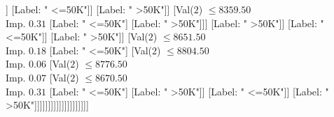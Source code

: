 \documentclass[margin=10pt]{standalone}
\begin{document}
\begin{forest}
																																													[Val($2$) $ \leq 8549.50$ \\ Imp. $0.02$
																																														[Val($2$) $ \leq 8508.50$ \\ Imp. $0.06$
																																															[Val($2$) $ \leq 8430.50$ \\ Imp. $0.17$
																																																[Val($2$) $ \leq 8377.50$ \\ Imp. $0.09$
																																																	[Val($2$) $ \leq 8260.50$ \\ Imp. $0.07$
																																																		[Val($2$) $ \leq 8157.50$ \\ Imp. $0.29$
																																																			[Val($2$) $ \leq 8137.50$ \\ Imp. $0.42$
																																																				[Val($2$) $ \leq 8125.50$ \\ Imp. $0.25$
																																																					[Label: " <=50K"]
																																																					[Label: " >50K"]]
																																																				[Label: " <=50K"]]
																																																			[Label: " >50K"]]
																																																		[Val($2$) $ \leq 8359.50$ \\ Imp. $0.31$
																																																			[Label: " <=50K"]
																																																			[Label: " >50K"]]]
																																																	[Label: " >50K"]]
																																																[Label: " <=50K"]]
																																															[Label: " >50K"]]
																																														[Val($2$) $ \leq 8651.50$ \\ Imp. $0.18$
																																															[Label: " <=50K"]
																																															[Val($2$) $ \leq 8804.50$ \\ Imp. $0.06$
																																																[Val($2$) $ \leq 8776.50$ \\ Imp. $0.07$
																																																	[Val($2$) $ \leq 8670.50$ \\ Imp. $0.31$
																																																		[Label: " <=50K"]
																																																		[Label: " >50K"]]
																																																	[Label: " <=50K"]]
																																																[Label: " >50K"]]]]]]]]]]]]]]]]]]]]

\end{forest}
\end{document}
